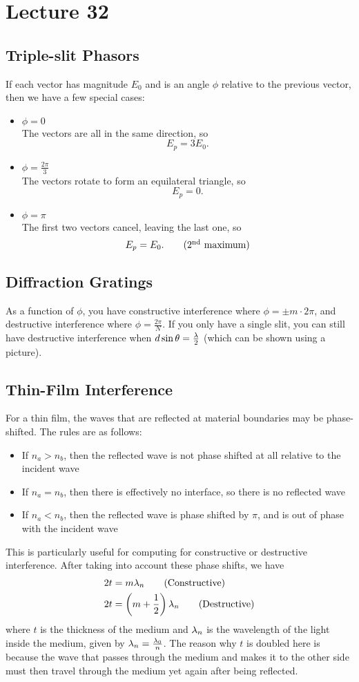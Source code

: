 \documentclass[class=article, crop=false]{standalone}
\begin{document}
  \section{Lecture 32}
  \subsection{Triple-slit Phasors}
  If each vector has magnitude $E_0$ and is an angle $\phi$ relative to the previous vector, then we have a few special cases:
  \begin{itemize}
    \item $\phi = 0$ \\
    The vectors are all in the same direction, so
    \[
      E_p = 3E_0. \tag{maximum}
    \]
    \item $\phi = \frac{2\pi}{3}$ \\
    The vectors rotate to form an equilateral triangle, so
    \[
      E_p = 0.
    \]
    \item $\phi = \pi$ \\
    The first two vectors cancel, leaving the last one, so
    \[
      E_p = E_0. \tag{2\tsup{nd} maximum}
    \]
  \end{itemize}
  \subsection{Diffraction Gratings}
  As a function of $\phi$, you have constructive interference where $\phi = \pm m\cdot 2\pi$, and destructive interference where $\phi = \frac{2\pi}{N}$. If you only have a single slit, you can still have destructive interference when $d\sin\theta = \frac{\lambda}{2}$ (which can be shown using a picture).
  \subsection{Thin-Film Interference}
  For a thin film, the waves that are reflected at material boundaries may be phase-shifted. The rules are as follows:
  \begin{itemize}
    \item If $n_a > n_b$, then the reflected wave is not phase shifted at all relative to the incident wave
    \item If $n_a = n_b$, then there is effectively no interface, so there is no reflected wave
    \item If $n_a < n_b$, then the reflected wave is phase shifted by $\pi$, and is out of phase with the incident wave
  \end{itemize}
  This is particularly useful for computing for constructive or destructive interference. After taking into account these phase shifts, we have
  \begin{align*}
    2t &= m\lambda_n \tag{Constructive} \\
    2t &= \left( m+\frac{1}{2} \right)\lambda_n \tag{Destructive}
  \end{align*}
  where $t$ is the thickness of the medium and $\lambda_n$ is the wavelength of the light inside the medium, given by $\lambda_n = \frac{\lambda_0}{n}$. The reason why $t$ is doubled here is because the wave that passes through the medium and makes it to the other side must then travel through the medium yet again after being reflected.
\end{document}
